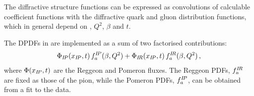 The diffractive structure functions can be expressed as convolutions of 
calculable coefficient functions with the diffractive quark and gluon distribution functions,
 which in general depend on \xpom, $Q^2$, $\beta$ and $t$.

The DPDFs \cite{Aktas:2006hy, zeus:diff2009} in \fitter are implemented as a sum 
of two factorised contributions:
\begin{equation}
 \Phi_{I\!P}(x_{I\!P},t)\, f^{{I\!P}}_{a}(\beta,Q^2)
  + 
 \Phi_{I\!R}(x_{I\!P},t)\, f^{{I\!R}}_{a}(\beta,Q^2)
 \,,
\end{equation} 
where $\Phi(x_{I\!P},t)$ are the Reggeon and Pomeron fluxes.
The Reggeon PDFs, $f^{{I\!R}}_{a}$ are fixed as those of the pion, while the Pomeron PDFs,
$f^{{I\!P}}_{a}$, can be obtained from a fit to the data.

